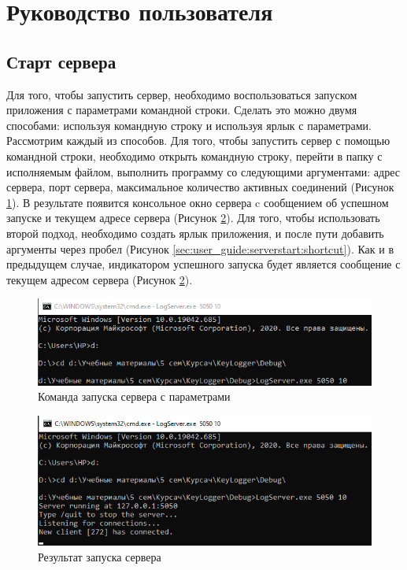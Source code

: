 \section{Руководство пользователя}
\label{sec:user_guide}

\subsection{Старт сервера} 
\label{sec:user_guide:serverstart}

Для того, чтобы запустить сервер, необходимо воспользоваться запуском приложения с параметрами командной строки. Сделать это можно двумя способами: используя командную строку и используя ярлык с параметрами. Рассмотрим каждый из способов. 
Для того, чтобы запустить сервер с помощью командной строки, необходимо открыть командную строку, перейти в папку с исполняемым файлом, выполнить программу со следующими аргументами: адрес сервера, порт сервера, максимальное количество активных соединений (Рисунок \ref*{sec:user_guide:serverstart:conrunargs}). В результате появится консольное окно сервера c сообщением об успешном запуске и текущем адресе сервера (Рисунок \ref*{sec:user_guide:serverstart:runres}). 
Для того, чтобы использовать второй подход, необходимо создать ярлык приложения, и после пути добавить аргументы через пробел (Рисунок \ref*{sec:user_guide:serverstart:shortcut}). Как и в предыдущем случае, индикатором успешного запуска будет является сообщение с текущем адресом сервера (Рисунок \ref*{sec:user_guide:serverstart:runres}).

\begin{figure}[ht]
	\centering
	  \includegraphics[scale=0.9]{attachments/conrunargs.png}  
	  \caption{ Команда запуска сервера с параметрами }
	  \label{sec:user_guide:serverstart:conrunargs}
\end{figure}

\begin{figure}[ht]
	\centering
	  \includegraphics[scale=0.9]{attachments/runres.png}  
	  \caption{ Результат запуска сервера }
	  \label{sec:user_guide:serverstart:runres}
\end{figure}

